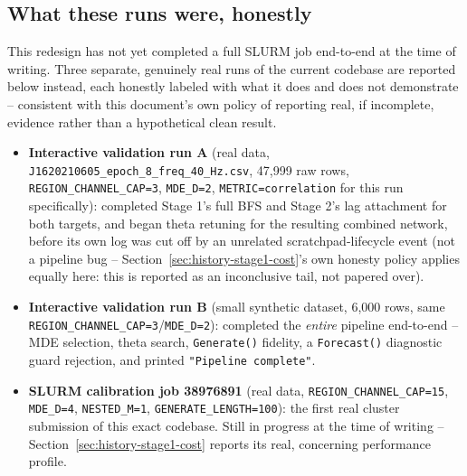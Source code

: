 \documentclass[11pt]{article}
\begin{document}
\subsection{What these runs were, honestly}
This redesign has not yet completed a full SLURM job end-to-end at the time of writing. Three separate, genuinely real runs of the current codebase are reported below instead, each honestly labeled with what it does and does not demonstrate -- consistent with this document's own policy of reporting real, if incomplete, evidence rather than a hypothetical clean result.
\begin{itemize}
  \item \textbf{Interactive validation run A} (real data, \texttt{J1620210605\_epoch\_8\_freq\_40\_Hz.csv}, 47{,}999 raw rows, \texttt{REGION\_CHANNEL\_CAP=3}, \texttt{MDE\_D=2}, \texttt{METRIC=correlation} for this run specifically): completed Stage 1's full BFS and Stage 2's lag attachment for both targets, and began theta retuning for the resulting combined network, before its own log was cut off by an unrelated scratchpad-lifecycle event (not a pipeline bug -- Section~\ref{sec:history-stage1-cost}'s own honesty policy applies equally here: this is reported as an inconclusive tail, not papered over).
  \item \textbf{Interactive validation run B} (small synthetic dataset, 6{,}000 rows, same \texttt{REGION\_CHANNEL\_CAP=3}/\texttt{MDE\_D=2}): completed the \emph{entire} pipeline end-to-end -- MDE selection, theta search, \texttt{Generate()} fidelity, a \texttt{Forecast()} diagnostic guard rejection, and printed \texttt{"Pipeline complete"}.
  \item \textbf{SLURM calibration job 38976891} (real data, \texttt{REGION\_CHANNEL\_CAP=15}, \texttt{MDE\_D=4}, \texttt{NESTED\_M=1}, \texttt{GENERATE\_LENGTH=100}): the first real cluster submission of this exact codebase. Still in progress at the time of writing -- Section~\ref{sec:history-stage1-cost} reports its real, concerning performance profile.
\end{itemize}
\end{document}
